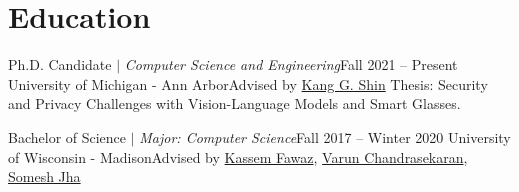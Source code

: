 \section{Education}
  \CVSubHeadingListStart
    \CVSubheadingLong
      {{Ph.D. Candidate $|$ \emph{\small{Computer Science and Engineering}}}}{Fall 2021 -- Present}
      {University of Michigan - Ann Arbor}{Advised by \href{https://web.eecs.umich.edu/~kgshin/}{Kang G. Shin}}
      {Thesis: Security and Privacy Challenges with Vision-Language Models and Smart Glasses.}{}

    \CVSubheading
      {{Bachelor of Science $|$ \emph{\small{Major: Computer Science}}}}{Fall 2017 -- Winter 2020}
      {University of Wisconsin - Madison}{Advised by \href{https://kassemfawaz.com/}{Kassem Fawaz}, \href{https://chandrasekaran-group.github.io/}{Varun Chandrasekaran}, \href{https://pages.cs.wisc.edu/~jha/}{Somesh Jha}}
  \CVSubHeadingListEnd